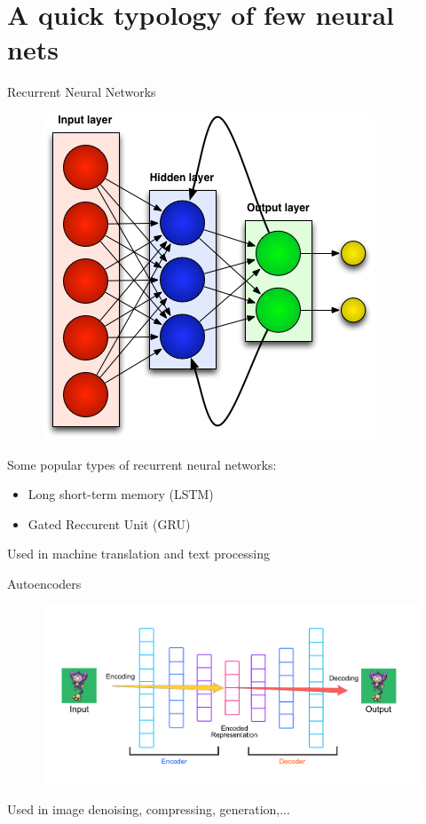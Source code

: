 \documentclass[handout]{beamer}
\begin{document}
\section{A quick typology of few neural nets}
\begin{frame}{Recurrent Neural Networks}
    \begin{figure}
        \centering
        \includegraphics[width=.4\textwidth]{fig/L2/rnn.png}

    \end{figure}

Some popular types of recurrent neural networks:
\begin{itemize}
    \item Long short-term memory (LSTM)
    \item Gated Reccurent Unit (GRU)
\end{itemize}
\alert{Used in machine translation and text processing}
\end{frame}

\begin{frame}{Autoencoders}
    \begin{figure}
        \centering
        \includegraphics[width=.9\textwidth]{fig/L2/AE.png}

    \end{figure}
\alert{Used in image denoising, compressing, generation,...}
    
\end{frame}
\end{document}
